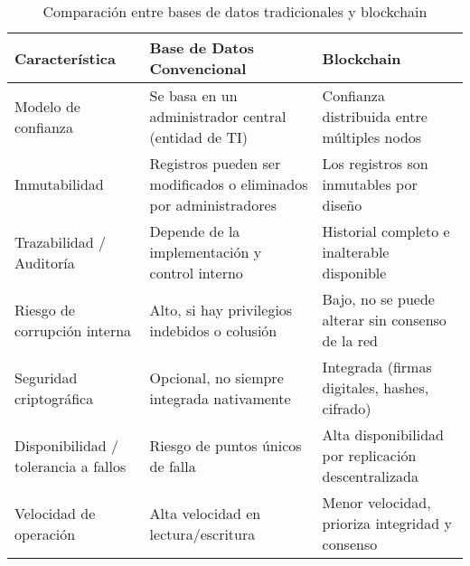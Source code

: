 \begin{table}[htbp]
\centering
\begin{tabular}{|p{4.5cm}|p{5.2cm}|p{5.2cm}|}
\hline
\textbf{Característica} & \textbf{Base de Datos Convencional} & \textbf{Blockchain} \\
\hline
Modelo de confianza & Se basa en un administrador central (entidad de TI) & Confianza distribuida entre múltiples nodos \\
\hline
Inmutabilidad & Registros pueden ser modificados o eliminados por administradores & Los registros son inmutables por diseño \\
\hline
Trazabilidad / Auditoría & Depende de la implementación y control interno & Historial completo e inalterable disponible \\
\hline
Riesgo de corrupción interna & Alto, si hay privilegios indebidos o colusión & Bajo, no se puede alterar sin consenso de la red \\
\hline
Seguridad criptográfica & Opcional, no siempre integrada nativamente & Integrada (firmas digitales, hashes, cifrado) \\
\hline
Disponibilidad / tolerancia a fallos & Riesgo de puntos únicos de falla & Alta disponibilidad por replicación descentralizada \\
\hline
Velocidad de operación & Alta velocidad en lectura/escritura & Menor velocidad, prioriza integridad y consenso \\
\hline
\end{tabular}
\caption{Comparación entre bases de datos tradicionales y blockchain}
\end{table} 